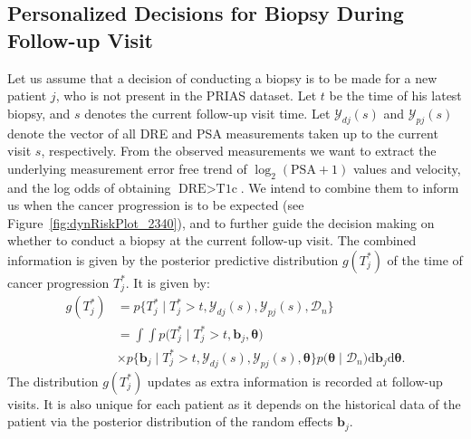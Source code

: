 \subsection{Personalized Decisions for Biopsy During Follow-up Visit}
\label{subsec:pers_decision_making}
Let us assume that a decision of conducting a biopsy is to be made for a new patient $j$, who is not present in the PRIAS dataset. Let $t$ be the time of his latest biopsy, and $s$ denotes the current follow-up visit time. Let $\mathcal{Y}_{dj}(s)$ and $\mathcal{Y}_{pj}(s)$ denote the vector of all DRE and PSA measurements taken up to the current visit $s$, respectively. From the observed measurements we want to extract the underlying measurement error free trend of $\log_2 (\mbox{PSA} + 1)$ values and velocity, and the log odds of obtaining $\mbox{DRE} > \mbox{T1c}$. We intend to combine them to inform us when the cancer progression is to be expected (see Figure~\ref{fig:dynRiskPlot_2340}), and to further guide the decision making on whether to conduct a biopsy at the current follow-up visit. The combined information is given by the posterior predictive distribution $g(T^*_j)$ of the time of cancer progression $T^*_j$. It is given by:
\begin{equation*}
\label{eq:post_pred_dist}
\begin{aligned}
g(T^*_j) &= p\big\{T^*_j \mid T^*_j > t, \mathcal{Y}_{dj}(s), \mathcal{Y}_{pj}(s), \mathcal{D}_n\big\}\\
&= \int \int p\big(T^*_j \mid T^*_j > t, \boldsymbol{b}_j, \boldsymbol{\theta}\big)\\
&\times p\big\{\boldsymbol{b}_j \mid T^*_j>t, \mathcal{Y}_{dj}(s), \mathcal{Y}_{pj}(s), \boldsymbol{\theta}\big\}p\big(\boldsymbol{\theta} \mid \mathcal{D}_n\big) \mathrm{d} \boldsymbol{b}_j \mathrm{d} \boldsymbol{\theta}.
\end{aligned}
\end{equation*}
The distribution $g(T^*_j)$ updates as extra information is recorded at follow-up visits. It is also unique for each patient as it depends on the historical data of the patient via the posterior distribution of the random effects $\boldsymbol{b}_j$.


